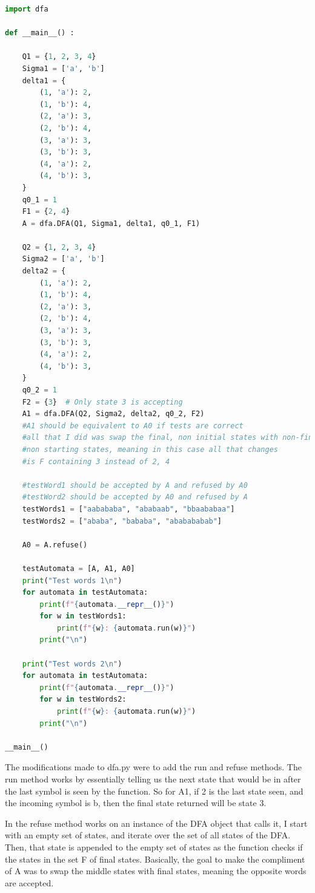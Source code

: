 \documentclass{article}
\theoremstyle{theorem}
\theoremstyle{definition}
\theoremstyle{remark}
\begin{document}
\begin{lstlisting}[language=Python]
import dfa

def __main__() :

    Q1 = {1, 2, 3, 4}
    Sigma1 = ['a', 'b']
    delta1 = {
        (1, 'a'): 2,
        (1, 'b'): 4,
        (2, 'a'): 3,
        (2, 'b'): 4,
        (3, 'a'): 3,
        (3, 'b'): 3,
        (4, 'a'): 2,
        (4, 'b'): 3,
    }
    q0_1 = 1
    F1 = {2, 4}  
    A = dfa.DFA(Q1, Sigma1, delta1, q0_1, F1)

    Q2 = {1, 2, 3, 4}
    Sigma2 = ['a', 'b']
    delta2 = {
        (1, 'a'): 2,
        (1, 'b'): 4,
        (2, 'a'): 3,
        (2, 'b'): 4,
        (3, 'a'): 3,
        (3, 'b'): 3,
        (4, 'a'): 2,
        (4, 'b'): 3,
    }
    q0_2 = 1
    F2 = {3}  # Only state 3 is accepting
    A1 = dfa.DFA(Q2, Sigma2, delta2, q0_2, F2)
    #A1 should be equivalent to A0 if tests are correct
    #all that I did was swap the final, non initial states with non-final
    #non starting states, meaning in this case all that changes
    #is F containing 3 instead of 2, 4
    
    #testWord1 should be accepted by A and refused by A0
    #testWord2 should be accepted by A0 and refused by A
    testWords1 = ["aabababa", "ababaab", "bbaababaa"]
    testWords2 = ["ababa", "bababa", "ababababab"]

    A0 = A.refuse()

    testAutomata = [A, A1, A0]
    print("Test words 1\n")
    for automata in testAutomata:
        print(f"{automata.__repr__()}")
        for w in testWords1:
            print(f"{w}: {automata.run(w)}")
        print("\n")
    
    print("Test words 2\n")
    for automata in testAutomata:
        print(f"{automata.__repr__()}")
        for w in testWords2:
            print(f"{w}: {automata.run(w)}")
        print("\n")
        
__main__()
\end{lstlisting}

The modifications made to dfa.py were to add the run and refuse methods.  The run method works by essentially telling us the next
state that would be in after the last symbol is seen by the function.  So for A1, if 2 is the last state seen, and the incoming symbol is b, then the final state returned will be state 3.

In the refuse method works on an instance of the DFA object that calls it,  I start with an empty set of states,  and iterate over the set of all states of the DFA.  Then,  that state is appended to the empty set of states as the function checks if the states in the set F of final states.  Basically,  the goal to make the compliment of A was to swap the middle states with final states, meaning the opposite words are accepted.
\end{document}
